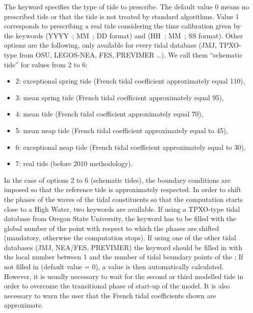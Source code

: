 The keyword  specifies the type of tide to prescribe. The default value
0 means no prescribed tide or that the tide is not treated by standard
algorithms. Value 1 corresponds to prescribing a real tide considering the time
calibration given by the keywords  (YYYY~; MM~;
DD format) and  (HH~; MM~; SS format). Other
options are the following, only available for every tidal database (JMJ,
TPXO-type from OSU, LEGOS-NEA, FES, PREVIMER \ldots).
We call them “schematic tide” for values from 2 to 6:

\begin{itemize}
\item 2: exceptional spring tide (French tidal coefficient approximately equal
110),

\item 3: mean spring tide (French tidal coefficient approximately equal 95),

\item 4: mean tide (French tidal coefficient approximately equal 70),

\item 5: mean neap tide (French tidal coefficient approximately equal to 45),

\item 6: exceptional neap tide (French tidal coefficient approximately equal
to 30),

\item 7: real tide (before 2010 methodology).
\end{itemize}

In the case of options 2 to 6 (schematic tides), the boundary conditions are
imposed so that the reference tide is approximately respected.
In order to shift the phases of the waves of the tidal constituents so that
the computation starts close to a High Water, two keywords are available.
If using a TPXO-type tidal database from Oregon State University, the keyword
 has to be filled
with the global number of the point with respect to which the phases are shifted
(mandatory, otherwise the computation stops).
If using one of the other tidal databases (JMJ, NEA/FES, PREVIMER) the keyword
 should be filled in
with the local number between 1 and the number of tidal boundary points of the
; If not filled in (default value = 0), a value
is then automatically calculated. However, it is usually necessary to
wait for the second or third modelled tide in order to overcome the
transitional phase of start-up of the model. It is also necessary to warn the
user that the French tidal coefficients shown are approximate.

